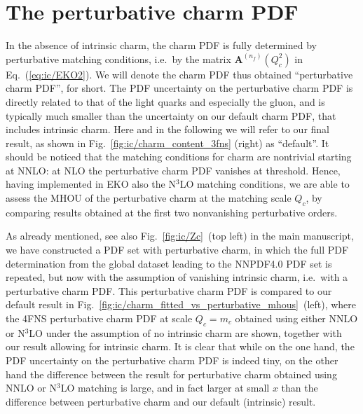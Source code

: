 \clearpage
\section{The perturbative charm PDF}
\label{app:ic/consistency}

In the absence of intrinsic charm, the charm PDF is fully determined by
perturbative matching conditions, i.e.\ by the matrix
$\mathbf{A}^{(n_f)}(Q_{c}^2)$ in Eq.~(\ref{eq:ic/EKO2}).
%
We will denote the
charm PDF thus obtained
``perturbative charm PDF'', for short. The PDF
uncertainty on the perturbative charm PDF is directly related to that 
of the light quarks and especially the gluon, and is typically much smaller
than  the  uncertainty on our default charm PDF, that includes
intrinsic charm. Here and in the following we will refer to our final
result, as shown in Fig.~\ref{fig:ic/charm_content_3fns} (right) as ``default''.
%
It should be noticed that the matching conditions for charm are 
nontrivial starting
at NNLO: at NLO the perturbative charm PDF vanishes at threshold.
%
Hence, having implemented in EKO also the N$^3$LO matching conditions,
we are able to assess the MHOU of the perturbative charm at the
matching scale $Q_c$, by comparing
results obtained at the first two nonvanishing perturbative
orders.

As already mentioned, see also Fig.~\ref{fig:ic/Zc}~(top left) in the main manuscript, we have
constructed a PDF set with perturbative charm, in which the full PDF
determination from the global dataset leading to the NNPDF4.0 PDF set
is repeated, but now with the assumption of vanishing intrinsic charm,
i.e.\ with a perturbative charm PDF.
%
This perturbative charm PDF is compared to our default result
in Fig.~\ref{fig:ic/charm_fitted_vs_perturbative_mhous}~(left), where the 4FNS
perturbative 
charm PDF at scale  $Q_c=m_c$ obtained using either NNLO or N$^3$LO
under the assumption of no intrinsic charm are shown, together with
our  result allowing for intrinsic charm.
%
It is clear that while on the one hand, the PDF uncertainty on the
perturbative charm PDF is indeed tiny, on the other
hand the difference between the result for perturbative charm
obtained using NNLO or N$^3$LO matching is large, and in
fact larger at small $x$ than the difference between perturbative charm and our
default (intrinsic) result.

